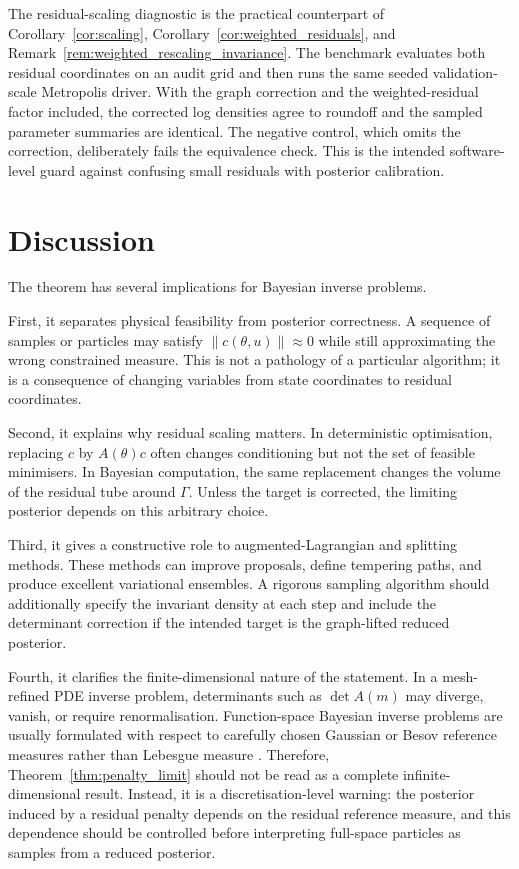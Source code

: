 \documentclass[11pt]{article}
\newcommand{\norm}[1]{\left\lVert #1\right\rVert}
\begin{document}
The residual-scaling diagnostic is the practical counterpart of Corollary~\ref{cor:scaling}, Corollary~\ref{cor:weighted_residuals}, and Remark~\ref{rem:weighted_rescaling_invariance}. The benchmark evaluates both residual coordinates on an audit grid and then runs the same seeded validation-scale Metropolis driver. With the graph correction and the weighted-residual factor included, the corrected log densities agree to roundoff and the sampled parameter summaries are identical. The negative control, which omits the correction, deliberately fails the equivalence check. This is the intended software-level guard against confusing small residuals with posterior calibration.

\section{Discussion}
\label{sec:discussion}

The theorem has several implications for Bayesian inverse problems.

First, it separates physical feasibility from posterior correctness. A sequence of samples or particles may satisfy \(\norm{c(\theta,u)}\approx0\) while still approximating the wrong constrained measure. This is not a pathology of a particular algorithm; it is a consequence of changing variables from state coordinates to residual coordinates.

Second, it explains why residual scaling matters. In deterministic optimisation, replacing \(c\) by \(A(\theta)c\) often changes conditioning but not the set of feasible minimisers. In Bayesian computation, the same replacement changes the volume of the residual tube around \(\Gamma\). Unless the target is corrected, the limiting posterior depends on this arbitrary choice.

Third, it gives a constructive role to augmented-Lagrangian and splitting methods. These methods can improve proposals, define tempering paths, and produce excellent variational ensembles. A rigorous sampling algorithm should additionally specify the invariant density at each step and include the determinant correction if the intended target is the graph-lifted reduced posterior.

Fourth, it clarifies the finite-dimensional nature of the statement. In a mesh-refined PDE inverse problem, determinants such as \(\det A(m)\) may diverge, vanish, or require renormalisation. Function-space Bayesian inverse problems are usually formulated with respect to carefully chosen Gaussian or Besov reference measures rather than Lebesgue measure \cite{Stuart2010,CotterRobertsStuartWhite2013, BeskosPinskiSanzSernaStuart2011,HairerStuartVollmer2014,Law2014, BuiThanhNguyen2016}. Therefore, Theorem~\ref{thm:penalty_limit} should not be read as a complete infinite-dimensional result. Instead, it is a discretisation-level warning: the posterior induced by a residual penalty depends on the residual reference measure, and this dependence should be controlled before interpreting full-space particles as samples from a reduced posterior.
\end{document}
